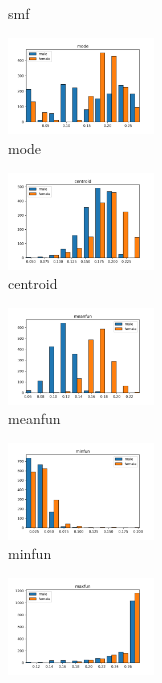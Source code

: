 \documentclass[a4paper]{article}    %
\begin{document}
\begin{figure}[H]
\begin{subfigure}{0.32\textwidth}
        \caption{smf}
        \label{fig:sub_sbs_9}
    \end{subfigure}\hfill
    \begin{subfigure}{0.32\textwidth}
        \centering
        \includegraphics[width=3.85cm]{sbs_9_mode}
        \caption{mode}
        \label{fig:sub_sbs_10}
    \end{subfigure}\hfill
    \begin{subfigure}{0.32\textwidth}
        \centering
        \includegraphics[width=3.85cm]{sbs_10_centroid}
        \caption{centroid}
        \label{fig:sub_sbs_11}
    \end{subfigure}\hfill
    \begin{subfigure}{0.32\textwidth}
        \centering
        \includegraphics[width=3.85cm]{sbs_11_meanfun}
        \caption{meanfun}
        \label{fig:sub_sbs_12}
    \end{subfigure}\hfill
    \begin{subfigure}{0.32\textwidth}
        \centering
        \includegraphics[width=3.85cm]{sbs_12_minfun}
        \caption{minfun}
        \label{fig:sub_sbs_13}
    \end{subfigure}\hfill
    \begin{subfigure}{0.32\textwidth}
        \centering
        \includegraphics[width=3.85cm]{sbs_13_maxfun}

\end{subfigure}
\end{figure}
\end{document}

